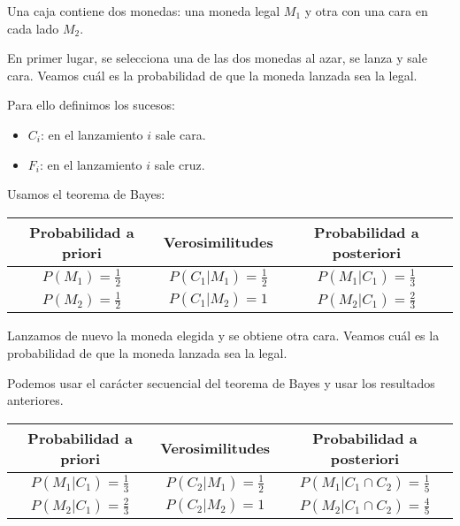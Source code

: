 \begin{example}
    Una caja contiene dos monedas: una moneda legal $M_1$ y otra con una cara en cada lado $M_2$.

    En primer lugar, se selecciona una de las dos monedas al azar, se lanza y sale cara.
    Veamos cuál es la probabilidad de que la moneda lanzada sea la legal.

    Para ello definimos los sucesos:
    \begin{itemize}
        \item $C_i$: en el lanzamiento $i$ sale cara.
        \item $F_i$: en el lanzamiento $i$ sale cruz.
    \end{itemize}

    Usamos el teorema de Bayes:
    \begin{center}
        \begin{tabular}{| c | c | c |}
            \hline
            Probabilidad a priori  & Verosimilitudes            & Probabilidad a posteriori  \\
            \hline
            $P(M_1) = \frac{1}{2}$ & $P(C_1|M_1) = \frac{1}{2}$ & $P(M_1|C_1) = \frac{1}{3}$ \\
            $P(M_2) = \frac{1}{2}$ & $P(C_1|M_2) = 1$           & $P(M_2|C_1) = \frac{2}{3}$ \\
            \hline
        \end{tabular}
    \end{center}

    Lanzamos de nuevo la moneda elegida y se obtiene otra cara.
    Veamos cuál es la probabilidad de que la moneda lanzada sea la legal.

    Podemos usar el carácter secuencial del teorema de Bayes y usar los resultados anteriores.

    \begin{center}
        \begin{tabular}{| c | c | c |}
            \hline
            Probabilidad a priori      & Verosimilitudes            & Probabilidad a posteriori           \\
            \hline
            $P(M_1|C_1) = \frac{1}{3}$ & $P(C_2|M_1) = \frac{1}{2}$ & $P(M_1|C_1 \cap C_2) = \frac{1}{5}$ \\
            $P(M_2|C_1) = \frac{2}{3}$ & $P(C_2|M_2) = 1$           & $P(M_2|C_1 \cap C_2) = \frac{4}{5}$ \\
            \hline
        \end{tabular}
    \end{center}
\end{example}


